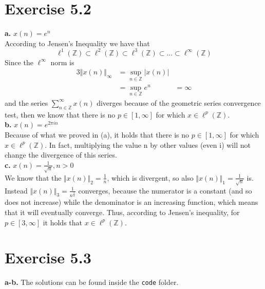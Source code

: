 \documentclass[12pt]{article}
\newcommand{\inte}{\mathbb{Z}}
\begin{document}
	\section*{Exercise 5.2}
	\textbf{a.} $x(n) = e^n$\\
	According to Jensen's Inequality we have that
	\begin{equation*}
		\ell^1(\inte) \subset \ell^2(\inte) \subset \ell^3(\inte) \subset ... \subset \ell^\infty(\inte)
	\end{equation*}
	Since the $\ell^\infty$ norm is
	\begin{alignat*}{3}
	\Vert x(n) \Vert_\infty &= \sup_{n \in \inte}\vert x(n) \vert\\
	&=  \sup_{n \in \inte} e^n &= \infty
	\end{alignat*}
	and the series $\sum_{n\in\inte}^{\infty} x(n)$ diverges because of the geometric series convergence test, then we know that there is no $p \in [1, \infty]$ for which $x \in \ell^p(\inte)$.\\
	
	\textbf{b.} $x(n) = e^{2\pi i n}$\\
	Because of what we proved in (a), it holds that there is no $p \in [1, \infty]$ for which $x \in \ell^p(\inte)$. In fact, multiplying the value n by other values (even i) will not change the divergence of this series.\\
	
	\textbf{c.} $x(n) = \frac{1}{\sqrt{n}}, n > 0$\\
	We know that the $\Vert x(n) \Vert_2 = \frac{1}{n}$, which is divergent, so also  $\Vert x(n) \Vert_1 = \frac{1}{\sqrt{n}}$ is. Instead $\Vert x(n) \Vert_3 = \frac{1}{n^{\frac{3}{2}}}$ converges, because the numerator is a constant (and so does not increase) while the denominator is an increasing function, which means that it will eventually converge. Thus, according to Jensen's inequality, for $p \in [3, \infty]$ it holds that $x \in \ell^p(\inte)$.
	\section*{Exercise 5.3}
	\textbf{a-b.} The solutions can be found inside the \texttt{code} folder.
\end{document}
